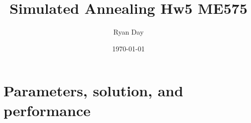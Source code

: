 \documentclass[a4paper]{article}
\title{Simulated Annealing Hw5 ME575}
\author{Ryan Day}
\date{\today}
\begin{document}
    \maketitle
    \section{Parameters, solution, and performance}
\end{document}
